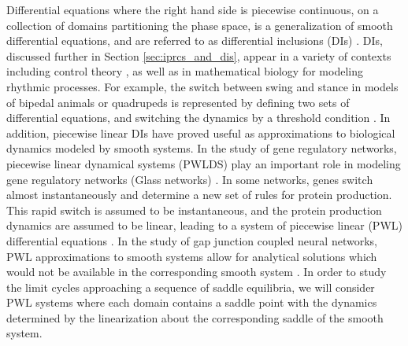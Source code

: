 \documentclass[12pt]{article}
\begin{document}
   Differential equations where the right hand side is piecewise continuous, on a collection of domains partitioning the phase space, is a generalization of smooth differential equations, and are referred to as differential inclusions (DIs) \cite{Filipov1988}.  DIs, discussed further in Section \ref{sec:iprcs_and_dis}, appear in a variety of contexts including control theory \cite{PadenSastry:1987}, as well as in mathematical biology for modeling rhythmic processes.  For example, the switch between swing and stance in models of bipedal animals or quadrupeds is represented by defining two sets of differential equations, and switching the dynamics by a threshold condition \cite{SpardyEtAlRubin2011a,SpardyEtAlRubin2011b}.  In addition, piecewise linear DIs have proved useful as approximations to biological dynamics modeled by smooth systems.  In the study of gene regulatory networks, piecewise linear dynamical systems (PWLDS) play an important role in modeling gene regulatory networks (Glass networks) \cite{
Glass1973103}. In some networks, genes switch almost instantaneously and 
determine a new set of rules for protein production.  This rapid switch is assumed to be instantaneous, and the protein production dynamics are assumed to be linear, leading to a system of piecewise linear (PWL) differential equations \cite{Gebert20071148}.  In the study of gap junction coupled neural networks, PWL approximations to smooth systems allow for analytical solutions which would not be available in the corresponding smooth system \cite{Coombes:2008:SIADS}.  In order to study the limit cycles approaching a sequence of saddle equilibria, we will consider PWL systems where each domain contains a saddle point with the dynamics determined by the linearization about the corresponding saddle of the smooth system.



   
\end{document}
